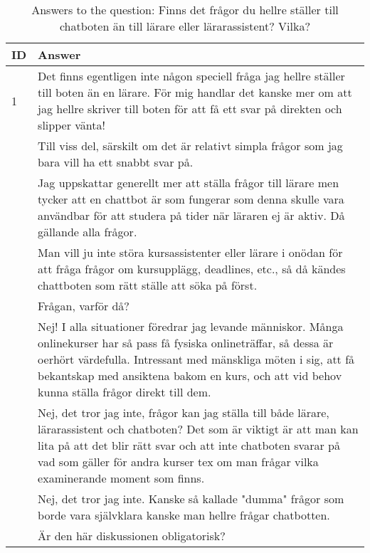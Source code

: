 \begin{table}[h]
\centering
{\small
\begin{tabularx}{\textwidth}{@{}lX@{}}
\toprule
\textbf{ID} & \textbf{Answer} \\ \midrule
1 & Det finns egentligen inte någon speciell fråga jag hellre ställer till boten än en lärare. För mig handlar det kanske mer om att jag hellre skriver till boten för att få ett svar på direkten och slipper vänta! \\ \hdashline
2 & Till viss del, särskilt om det är relativt simpla frågor som jag bara vill ha ett snabbt svar på. \\ \hdashline
3 & Jag uppskattar generellt mer att ställa frågor till lärare men tycker att en chattbot är som fungerar som denna skulle vara användbar för att studera på tider när läraren ej är aktiv. Då gällande alla frågor. \\ \hdashline
4 & Man vill ju inte störa kursassistenter eller lärare i onödan för att fråga frågor om kursupplägg, deadlines, etc., så då kändes chattboten som rätt ställe att söka på först. \\ \hdashline
5 & Frågan, varför då? \\ \hdashline
6 & Nej! I alla situationer föredrar jag levande människor. Många onlinekurser har så pass få fysiska onlineträffar, så dessa är oerhört värdefulla. Intressant med mänskliga möten i sig, att få bekantskap med ansiktena bakom en kurs, och att vid behov kunna ställa frågor direkt till dem. \\ \hdashline
7 & Nej, det tror jag inte, frågor kan jag ställa till både lärare, lärarassistent och chatboten? Det som är viktigt är att man kan lita på att det blir rätt svar och att inte chatboten svarar på vad som gäller för andra kurser tex om man frågar vilka examinerande moment som finns. \\ \hdashline
8 & Nej, det tror jag inte. Kanske så kallade "dumma" frågor som borde vara självklara kanske man hellre frågar chatbotten. \\ \hdashline
9 & Är den här diskussionen obligatorisk? \\
\bottomrule
\end{tabularx}
}
\vspace{2mm}
\caption{Answers to the question: Finns det frågor du hellre ställer till chatboten än till lärare eller lärarassistent? Vilka?}
\label{tab:appendix_typeform_table_question_chatbot_vs_teacher}
\end{table}

